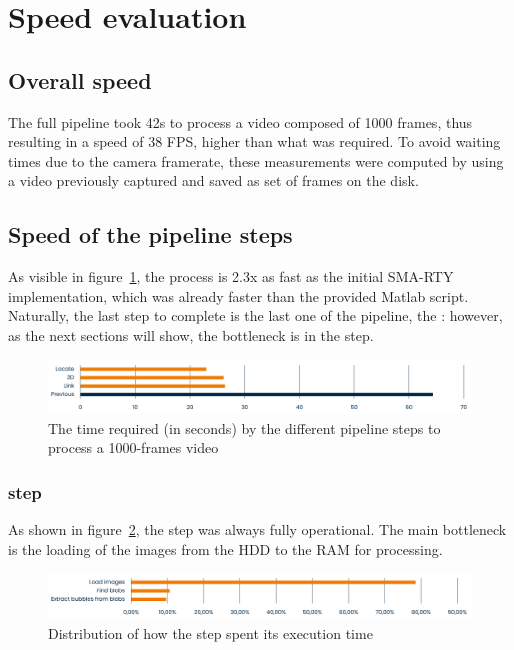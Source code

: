 \section{Speed evaluation}

\subsection{Overall speed}

The full pipeline took 42s to process a video composed of 1000 frames, thus resulting in a speed of 38 FPS, higher than what was required.
To avoid waiting times due to the camera framerate, these measurements were computed by using a video previously captured and saved as set of frames on the disk.

\subsection{Speed of the pipeline steps}

As visible in figure~\ref{fig:speed:all-pipeline}, the process is 2.3x as fast as the initial SMA-RTY implementation, which was already faster than the provided Matlab script.
Naturally, the last step to complete is the last one of the pipeline, the \link*: however, as the next sections will show, the bottleneck is in the \locate* step.

\begin{figure}
	\centerline{\includegraphics[width=\textwidth]{images/speed/overall-speed.png}}
	\caption{\centering The time required (in seconds) by the different pipeline steps to process a 1000-frames video}
	\label{fig:speed:all-pipeline}
\end{figure}

\subsubsection{\locate* step}

As shown in figure~\ref{fig:speed:locate}, the \locate* step was always fully operational.
The main bottleneck is the loading of the images from the HDD to the RAM for processing.

\begin{figure}
	\centerline{\includegraphics[width=\textwidth]{images/speed/locate.png}}
	\caption{\centering Distribution of how the \locate* step spent its execution time}
	\label{fig:speed:locate}
\end{figure}

